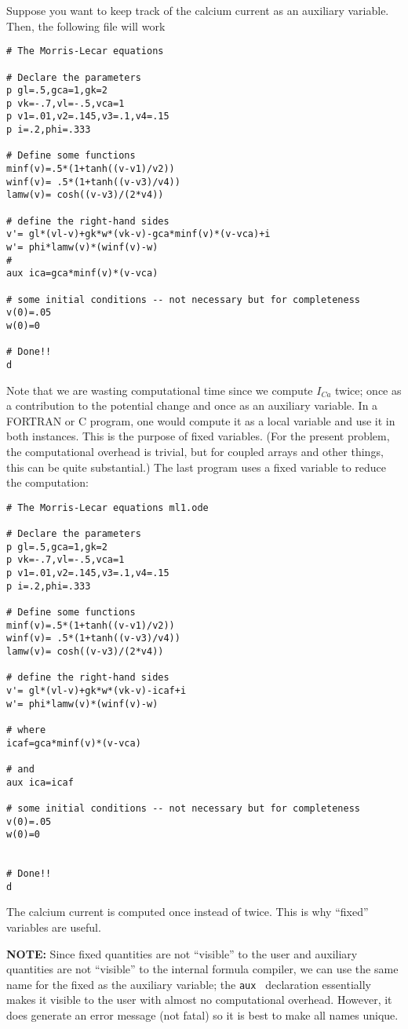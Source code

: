 \documentclass{article}
\begin{document}
Suppose you want to keep track of the calcium current as an auxiliary
variable.  Then, the following file will work
\begin{verbatim}
# The Morris-Lecar equations

# Declare the parameters
p gl=.5,gca=1,gk=2
p vk=-.7,vl=-.5,vca=1
p v1=.01,v2=.145,v3=.1,v4=.15
p i=.2,phi=.333

# Define some functions
minf(v)=.5*(1+tanh((v-v1)/v2))
winf(v)= .5*(1+tanh((v-v3)/v4))
lamw(v)= cosh((v-v3)/(2*v4))

# define the right-hand sides
v'= gl*(vl-v)+gk*w*(vk-v)-gca*minf(v)*(v-vca)+i
w'= phi*lamw(v)*(winf(v)-w)
#
aux ica=gca*minf(v)*(v-vca)

# some initial conditions -- not necessary but for completeness
v(0)=.05
w(0)=0

# Done!!
d
\end{verbatim}
Note that we are wasting computational time
since we compute $I_{Ca}$ twice; once as a contribution to the
potential change and once as an auxiliary variable.  In a FORTRAN or
C program, one would compute it as a local variable and use it in both
instances.  This is the purpose of fixed variables.  (For the present
problem, the computational overhead is trivial, but for coupled arrays
and other things, this can be quite substantial.)  The last program
uses a fixed variable to reduce the computation:
\begin{verbatim}
# The Morris-Lecar equations ml1.ode

# Declare the parameters
p gl=.5,gca=1,gk=2
p vk=-.7,vl=-.5,vca=1
p v1=.01,v2=.145,v3=.1,v4=.15
p i=.2,phi=.333

# Define some functions
minf(v)=.5*(1+tanh((v-v1)/v2))
winf(v)= .5*(1+tanh((v-v3)/v4))
lamw(v)= cosh((v-v3)/(2*v4))

# define the right-hand sides
v'= gl*(vl-v)+gk*w*(vk-v)-icaf+i
w'= phi*lamw(v)*(winf(v)-w)

# where
icaf=gca*minf(v)*(v-vca)

# and
aux ica=icaf

# some initial conditions -- not necessary but for completeness
v(0)=.05
w(0)=0


# Done!!
d
\end{verbatim}
The calcium current is computed once instead of twice.  This is why
``fixed'' variables are useful.


{\bf NOTE:}  Since fixed quantities are not ``visible'' to the user
and auxiliary quantities are not ``visible'' to the internal formula
compiler, we can use the same name for the fixed as the
auxiliary variable; the {\tt aux } declaration essentially makes it
visible to the user with almost no computational overhead. However, it
does generate an error message (not fatal) so it is best to make all
names unique.
\end{document}

